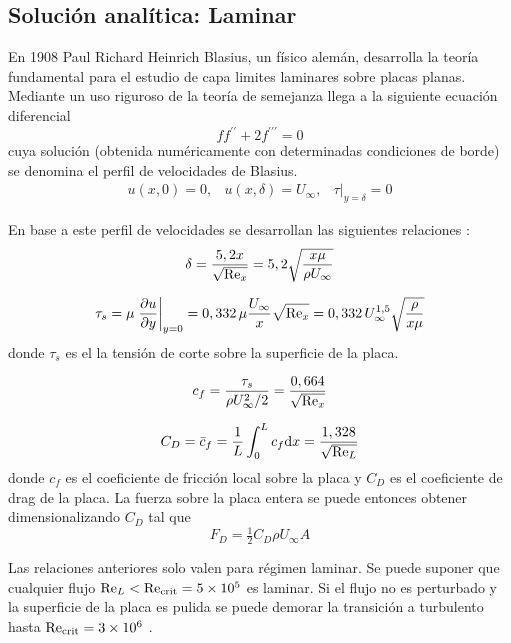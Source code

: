 \subsection{Solución analítica: Laminar}\label{ssec:capalimLaminar}
En 1908 Paul Richard Heinrich Blasius, un físico alemán, desarrolla la teoría fundamental para el estudio de capa limites laminares sobre placas planas. Mediante un uso riguroso de la teoría de semejanza llega a la siguiente ecuación diferencial
\[
ff^{\prime\prime}+2f^{\prime\prime\prime}=0
\]
cuya solución (obtenida numéricamente con determinadas condiciones de borde) se denomina el perfil de velocidades de Blasius.
\[
\begin{array}{lll}
u(x,0)=0, & u(x,\delta)=U_\infty, & \tau|_{y=\delta} =0
\end{array}
\]

En base a este perfil de velocidades se desarrollan las siguientes relaciones \citep{durst2008fluid}:
\begin{equation}
    \delta=\frac{5,2x}{\sqrt{\textrm{Re}_x}}=5,2\sqrt{\frac{x\mu}{\rho U_\infty}}
\end{equation}

\begin{equation}
    \tau_s=\mu \left. \frac{\partial u}{\partial y}\right|_{y=0}=0,332\,\mu\frac{U_\infty}{x}\sqrt{\textrm{Re}_x}=0,332\, U_\infty^{1,5}\sqrt{\frac{\rho}{x\mu}}
\end{equation}
donde $\tau_s$ es el la tensión de corte sobre la superficie de la placa. 

\begin{equation}
    c_f=\frac{\tau_s}{\rho U_\infty^2/2}=\frac{0,664}{\sqrt{\textrm{Re}_x}}
\end{equation}

\begin{equation}
    C_D=\bar{c}_f=\frac{1}{L}\int_0^Lc_f\textrm{d} x=\frac{1,328}{\sqrt{\textrm{Re}_L}}
\end{equation}
donde $c_f$ es el coeficiente de fricción local sobre la placa y $C_D$ es el coeficiente de drag de la placa. La fuerza sobre la placa entera se puede entonces obtener dimensionalizando $C_D$ tal que
\[
F_D=\tfrac{1}{2}C_D \rho U_\infty A
\]

Las relaciones anteriores solo valen para régimen laminar. Se puede suponer que cualquier flujo $\textrm{Re}_L<\textrm{Re}_{{\mathrm{crit}}}=\num{5e5}$ es laminar. Si el flujo no es perturbado y la superficie de la placa es pulida se puede demorar la transición a turbulento hasta $\textrm{Re}_{{\mathrm{crit}}}=\num{3e6}$ \citep{kreith2011principles}.

